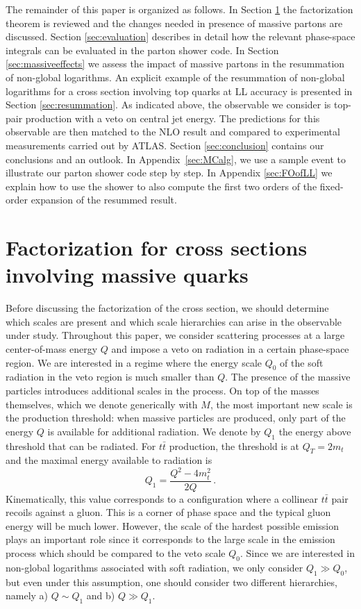 \documentclass[11pt,a4paper]{article}
\begin{document}
The remainder of this paper is organized as follows. In Section \ref{sec:factorization}  the factorization theorem \cite{Becher:2015hka,Becher:2016mmh}  is reviewed and the changes needed in presence of  massive partons  are discussed. Section \ref{sec:evaluation} describes  in detail how the relevant phase-space integrals can be evaluated in the parton shower code. In Section \ref{sec:massiveeffects} we assess  the impact of massive partons in the resummation of non-global logarithms. An explicit example of the resummation of non-global logarithms for a cross section involving top quarks at LL accuracy is presented in Section \ref{sec:resummation}. As indicated above, the observable  we consider is top-pair production with a veto on central jet energy. The predictions for this observable are then matched to the NLO result and compared  to experimental measurements carried out by ATLAS. Section \ref{sec:conclusion} contains our conclusions and an outlook. 
 In Appendix~\ref{sec:MCalg}, we use a sample event to illustrate our parton shower code step by step. In Appendix \ref{sec:FOofLL} we explain how to use the shower to also compute the first two orders of the fixed-order expansion of the resummed result.

\section{Factorization for cross sections involving massive quarks} \label{sec:factorization}

Before discussing the factorization of the cross section, we should determine  which scales are present  and which scale hierarchies can arise in the observable under study. Throughout this paper, we consider scattering processes at a large center-of-mass energy $Q$ and impose a veto on radiation in a certain phase-space region. We are interested in a regime where the energy scale $Q_0$ of the soft radiation in the veto region is much smaller than $Q$. The presence of the massive particles introduces additional scales in the process. On top of the masses themselves, which we denote generically with $M$, the most important new scale is the production threshold: when massive particles are produced, only part of the energy $Q$ is available for  additional radiation.   We  denote by $Q_1$ the energy above threshold that can be radiated. For $t\bar{t}$ production, the threshold is at $Q_T=2m_t$ and the maximal energy available to radiation is 
\begin{equation}\label{eq:hardest}
Q_1 = \frac{Q^2-4m_t^2}{2Q}\, .
\end{equation}
Kinematically, this value corresponds to a configuration where a collinear $t\bar{t}$ pair recoils against a gluon. This is a corner of phase space and the typical gluon energy will be much lower. However, the scale of the hardest possible emission plays an important role since it corresponds to the large scale in the emission process which should be compared to the veto scale $Q_0$. Since we are interested in non-global logarithms associated with soft radiation, we only consider $Q_1 \gg Q_0$, but even under this assumption, one should consider two different hierarchies, namely a) $Q \sim Q_1$ and b) $Q \gg Q_1$.
\end{document}
